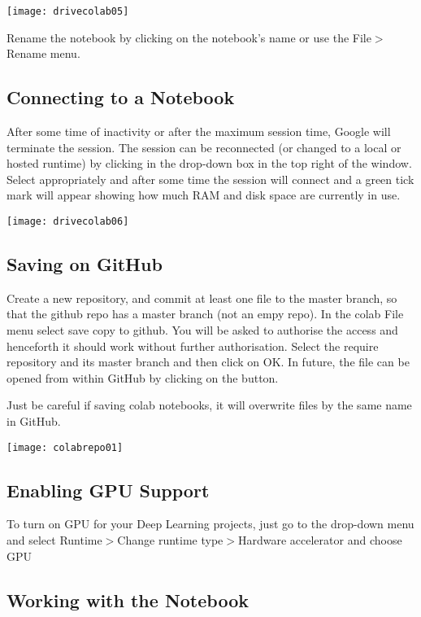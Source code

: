 \begin{marginfigure}
\texttt{[image: drivecolab05]}
\end{marginfigure}

Rename the notebook by clicking on the notebook's name or use the File$>$Rename menu.

\subsection{Connecting to a Notebook}
After some time of inactivity or after the maximum session time, Google will terminate the session.
The session can be reconnected (or changed to a local or hosted runtime) by clicking in the drop-down box in the top right of the window. Select appropriately and after some time the session will connect and a green tick mark will appear showing how much RAM and disk space are currently in use. 
\begin{marginfigure}
\texttt{[image: drivecolab06]}
\end{marginfigure}


\subsection{Saving on GitHub}

Create a new repository, and commit at least one file to the master branch, so that the github repo has a master branch (not an empy repo).
In the colab File menu select save copy to github.
You will be asked to authorise the access and henceforth it should work without further authorisation.
Select the require repository and its master branch and then click on OK.
In future, the file can be opened from within GitHub by clicking on the button.

Just be careful if saving colab notebooks, it will overwrite files by the same name in GitHub.
\begin{figure*}[h]
\texttt{[image: colabrepo01]}
\end{figure*}


\subsection{Enabling GPU Support}

To turn on GPU for your Deep Learning projects, just go to the drop-down menu and select Runtime$>$Change runtime type$>$Hardware accelerator and choose GPU

\subsection{Working with the Notebook}

